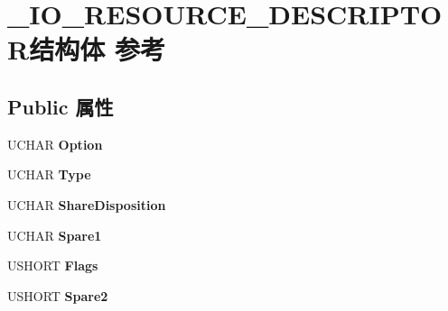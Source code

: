 \hypertarget{struct___i_o___r_e_s_o_u_r_c_e___d_e_s_c_r_i_p_t_o_r}{}\section{\+\_\+\+I\+O\+\_\+\+R\+E\+S\+O\+U\+R\+C\+E\+\_\+\+D\+E\+S\+C\+R\+I\+P\+T\+O\+R结构体 参考}
\label{struct___i_o___r_e_s_o_u_r_c_e___d_e_s_c_r_i_p_t_o_r}
\subsection*{Public 属性}
\begin{DoxyCompactItemize}
\item 
\mbox{\label{struct___i_o___r_e_s_o_u_r_c_e___d_e_s_c_r_i_p_t_o_r_ad7a47a5ef57e9fe4db440b206ac1243f}} 
U\+C\+H\+AR {\bfseries Option}
\item 
\mbox{\label{struct___i_o___r_e_s_o_u_r_c_e___d_e_s_c_r_i_p_t_o_r_ad8e352f006cc2b76e3a4c0d4a952e794}} 
U\+C\+H\+AR {\bfseries Type}
\item 
\mbox{\label{struct___i_o___r_e_s_o_u_r_c_e___d_e_s_c_r_i_p_t_o_r_ae338f0a86df4deb72ac5d873dba93f5f}} 
U\+C\+H\+AR {\bfseries Share\+Disposition}
\item 
\mbox{\label{struct___i_o___r_e_s_o_u_r_c_e___d_e_s_c_r_i_p_t_o_r_a0526172ec62870c9a02bdb3fc8b82b57}} 
U\+C\+H\+AR {\bfseries Spare1}
\item 
\mbox{\label{struct___i_o___r_e_s_o_u_r_c_e___d_e_s_c_r_i_p_t_o_r_a91efbbc16bee045bdf803eb78299b58d}} 
U\+S\+H\+O\+RT {\bfseries Flags}
\item 
\mbox{\label{struct___i_o___r_e_s_o_u_r_c_e___d_e_s_c_r_i_p_t_o_r_aa809a7c6b6b3b853e2209f13e01360d8}} 
U\+S\+H\+O\+RT {\bfseries Spare2}
\item 
\mbox{\label{struct___i_o___r_e_s_o_u_r_c_e___d_e_s_c_r_i_p_t_o_r_a48ddc444f8512001145bd66af921a095}} 

\end{DoxyCompactItemize}
